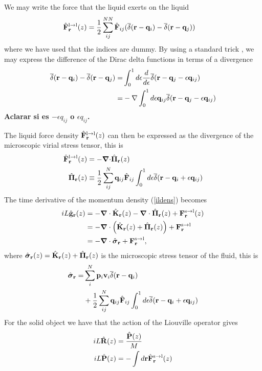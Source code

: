 \documentclass[b5paper,openright,11pt]{book}
\newcommand{\Note}[1]{{\bf \color{red}#1}}    %
\begin{document}
We may write the force that the liquid exerts on the liquid 
\begin{align}
  \hat{\bf F}^{\rm l\to l}_{\bf r}(z) &= \frac{1}{2}\sum^{NN}_{ij}\hat{\bf F}_{ij}
(\overline\delta({\bf r}-{\bf q}_i)-\overline\delta({\bf r}-{\bf q}_j))
\end{align}
where we  have used that  the indices are  dummy. By using  a standard
trick \cite{Schofield1982,Grabert1982}, we  may express the difference
of the Dirac delta functions in terms of a divergence
\begin{eqnarray}
\overline\delta({\bf r}-{\bf q}_i)-\overline\delta({\bf r}-{\bf q}_j)
=&\int_0^1d\epsilon\frac{d}{d\epsilon}
\overline\delta({\bf r}-{\bf q}_j-\epsilon{\bf q}_{ij})
\nonumber\\
=&-\nabla\int_0^1d\epsilon{\bf q}_{ij}
\overline\delta({\bf r}-{\bf q}_j-\epsilon{\bf q}_{ij})
\nonumber\\
\label{trick}
\end{eqnarray}
\Note{Aclarar si es $-\epsilon q_{ij}$ o $\epsilon q_{ij}$.}

The liquid  force density  $\hat{\bf F}^{\rm  l\to l}_{\bf  r}(z)$ can
then be expressed  as the divergence of the  microscopic virial stress
tensor, this is
\begin{align}
\hat{\bf F}^{\rm l\to l}_{\bf r}(z)&=-\boldsymbol{\nabla}{\cdot} \hat{\boldsymbol{\Pi}}_{\bf r}(z)
\nonumber\\
\hat{\boldsymbol{\Pi}}_{\bf r}(z)&\equiv \frac{1}{2}\sum^{N}_{ij}{\bf q}_{ij}\hat{\bf F}_{ij}
\int_0^{1}d\epsilon \overline\delta({\bf r}-{\bf q}_i+\epsilon{\bf q}_{ij})
\label{micfluxes}
\end{align}
The time derivative of the momentum density (\ref{ildens}) becomes
\begin{align}
    iL\hat{\bf g}_{\bf r}(z)
    &=-\boldsymbol{\nabla}\cdot \hat{{\bf K}}_{\bf r}(z) - \boldsymbol{\nabla}\cdot \hat{{\bf     \Pi}}_{\bf r}(z) +  {\bf F}^{\rm s\to l}_{\bf r}(z) \nonumber \\
    &= -\boldsymbol{\nabla}\cdot\left(\hat{{\bf K}}_{\bf r}(z)+\hat{{\bf \Pi}}_{\bf r}(z)\right) +{\bf F}^{\rm s\to l}_{\bf r} \nonumber \\
    &=-\boldsymbol{\nabla}\cdot \hat{\boldsymbol{\sigma}}_{\bf r}+{\bf F}^{\rm s\to l}_{\bf r},
\label{gls}
\end{align}
where     $\hat{\boldsymbol{\sigma}}_{\bf r}(z)=\hat{{\bf K}}_{\bf
r}(z)+\hat{\boldsymbol{\Pi}}_{\bf r}(z)$  is the microscopic stress
tensor of the fluid, this is
\begin{align}
  \hat{\boldsymbol{\sigma}}_{\bf r}=&
\sum^{N}_i{\bf p}_i{\bf v}_i
\overline\delta({\bf r}-{\bf q}_i)\nonumber\\
&+
\frac{1}{2}\sum^{N}_{ij}{\bf q}_{ij}\hat{\bf F}_{ij}
\int_0^{1}d\epsilon \overline\delta({\bf r}-{\bf q}_i+\epsilon{\bf q}_{ij})
\label{sigma}
\end{align}
For the solid object we have that the action of the Liouville operator gives
\begin{align}
    iL\hat{\bf R}(z) &=\frac{\hat{\bf P}(z)}{M}
  \nonumber\\
    iL\hat{\bf P}(z) &=-\int  d{\bf r} \hat{\bf F}^{\rm s\to l}_{\bf r}(z)
   \label{Pfsl}  
\end{align} 
\end{document}
